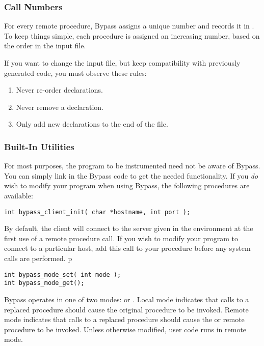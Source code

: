 \subsubsection{Call Numbers}

For every remote procedure, Bypass assigns a unique number and records it in .  To keep things simple, each procedure is assigned an increasing number, based on the order in the input file.


If you want to change the input file, but keep compatibility with previously generated code, you must observe these rules:

\begin{enumerate}
\item Never re-order declarations.
\item Never remove a declaration.
\item Only add new declarations to the end of the file.
\end{enumerate}

\subsubsection{Built-In Utilities}

For most purposes, the program to be instrumented need not be aware of Bypass.  You can simply link in the Bypass code to get the needed functionality.  If you {\em do} wish to modify your program when using Bypass, the following procedures are available:

\begin{verbatim}
int bypass_client_init( char *hostname, int port );
\end{verbatim}

By default, the client will connect to the server given in the environment at the first use of a remote procedure call.  If you wish to modify your program to connect to a particular host, add this call to your  procedure before any system calls are performed.
p
\begin{verbatim}
int bypass_mode_set( int mode );
int bypass_mode_get();
\end{verbatim}

Bypass operates in one of two modes:  or
.  Local mode indicates that calls to a replaced
procedure should cause the original procedure to be invoked.  Remote mode
indicates that calls to a replaced procedure should cause the 
 or remote procedure to be invoked.  Unless otherwise
modified, user code runs in remote mode.

